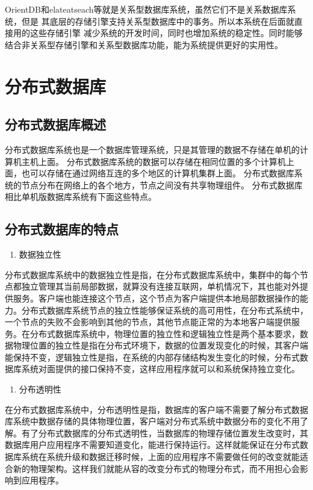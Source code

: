 OrientDB和elateatseach等就是关系型数据库系统，虽然它们不是关系数据库系统，但是
其底层的存储引擎支持关系型数据库中的事务。所以本系统在后面就直接用的这些存储引擎
减少系统的开发时间，同时也增加系统的稳定性。同时能够结合非关系型存储引擎和关系型数据库功能，能为系统提供更好的实用性。
\section{分布式数据库}
\subsection{分布式数据库概述}
分布式数据库系统也是一个数据库管理系统，只是其管理的数据不存储在单机的计算机主机上面。
分布式数据库系统的数据可以存储在相同位置的多个计算机上面，也可以存储在通过网络互连的多个地区的计算机集群上面。
分布式数据库系统的节点分布在网络上的各个地方，节点之间没有共享物理组件。
分布式数据库相比单机版数据库系统有下面这些特点。
\subsection{分布式数据库的特点}

	\begin{enumerate}
		\item 数据独立性
	\end{enumerate}

	分布式数据库系统中的数据独立性是指，在分布式数据库系统中，集群中的每个节点都独立管理其当前局部数据，就算没有连接互联网，单机情况下，其也能对外提供服务。客户端也能连接这个节点，这个节点为客户端提供本地局部数据操作的能力。分布式数据库系统节点的独立性能够保证系统的高可用性，在分布式系统中，一个节点的失败不会影响到其他的节点，其他节点能正常的为本地客户端提供服务。在分布式数据库系统中，物理位置的独立性和逻辑独立性是两个基本要求，数据物理位置的独立性是指在分布式环境下，数据的位置发现变化的时候，其客户端能保持不变，逻辑独立性是指，在系统的内部存储结构发生变化的时候，分布式数据库系统对面提供的接口保持不变，这样应用程序就可以和系统保持独立变化。
	

	\begin{enumerate}[resume]
		\item 分布透明性
	\end{enumerate}

	在分布式数据库系统中，分布透明性是指，数据库的客户端不需要了解分布式数据库系统中数据存储的具体物理位置，客户端对分布式系统中数据分布的变化不用了解。有了分布式数据库的分布式透明性，当数据库的物理存储位置发生改变时，其数据库用户应用程序不需要知道变化，能进行保持运行。这样就能保证在分布式数据库系统在系统升级和数据迁移时候，上面的应用程序不需要做任何的改变就能适合新的物理架构。这样我们就能从容的改变分布式的物理分布式，而不用担心会影响到应用程序。

